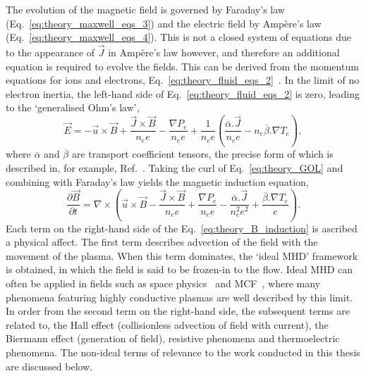 The evolution of the magnetic field is governed by Faraday's law (Eq.~\ref{eq:theory_maxwell_eqs_3}) and the electric field by Amp\`ere's law (Eq.~\ref{eq:theory_maxwell_eqs_4}).
This is not a closed system of equations due to the appearance of $\vec{J}$ in Amp\`ere's law however, and therefore an additional equation is required to evolve the fields.
This can be derived from the momentum equations for ions and electrons, Eq.~\ref{eq:theory_fluid_eqs_2}~\cite{farrow_extended_2023}.
In the limit of no electron inertia, the left-hand side of Eq.~\ref{eq:theory_fluid_eqs_2} is zero, leading to the `generalised Ohm's law',
\begin{equation}
    \label{eq:theory_GOL}
    \vec{E} = -\vec{u}\times\vec{B} + \frac{\vec{J}\times\vec{B}}{n_e e} - \frac{\nabla P_e}{n_e e} + \frac{1}{n_e e}\left( \frac{ \overline{\alpha} . \vec{J} }{ n_e e } - n_e \overline{\beta} . \nabla T_e \right),
\end{equation}
where $\overline{\alpha}$ and $\overline{\beta}$ are transport coefficient tensors, the precise form of which is described in, for example, Ref.~\cite{oneill_modelling_2023}.
Taking the curl of Eq.~\ref{eq:theory_GOL} and combining with Faraday's law yields the magnetic induction equation,
\begin{equation}
    \label{eq:theory_B_induction}
    \frac{\partial \vec{B}}{\partial t} = \nabla \times \left( \vec{u}\times\vec{B} - \frac{\vec{J}\times\vec{B}}{n_e e} + \frac{\nabla P_e}{n_e e} - \frac{ \overline{\alpha} . \vec{J} }{ n_e^2 e^2 } + \frac{\overline{\beta} . \nabla T_e}{e} \right).
\end{equation}
Each term on the right-hand side of the Eq.~\ref{eq:theory_B_induction} is ascribed a physical affect.
The first term describes advection of the field with the movement of the plasma.
When this term dominates, the `ideal \ac{MHD}' framework is obtained, in which the field is said to be frozen-in to the flow.
Ideal \ac{MHD} can often be applied in fields such as space physics~\cite{parks_why_2004,mathioudakis_alfven_2013} and \ac{MCF}~\cite{boozer_equations_1998}, where many phenomena featuring highly conductive plasmas are well described by this limit.
In order from the second term on the right-hand side, the subsequent terms are related to, the Hall effect (collisionless advection of field with current), the Biermann effect (generation of field), resistive phenomena and thermoelectric phenomena.
The non-ideal terms of relevance to the work conducted in this thesis are discussed below.

